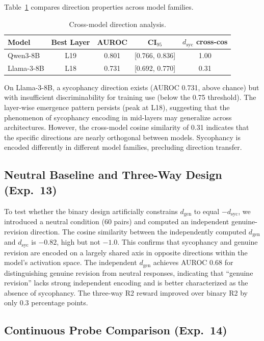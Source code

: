 \documentclass[11pt,a4paper]{article}
\newcommand{\dsyc}{$d_{\text{syc}}$}
\newcommand{\dgen}{$d_{\text{gen}}$}
\begin{document}
Table~\ref{tab:cross_model} compares direction properties across model families.

\begin{table}[h]
\centering
\small
\caption{Cross-model direction analysis.}
\label{tab:cross_model}
\begin{tabular}{lcccc}
\toprule
Model & Best Layer & AUROC & CI$_{95}$ & $d_{\text{syc}}$ cross-cos \\
\midrule
Qwen3-8B   & L19 & 0.801 & [0.766, 0.836] & 1.00 \\
Llama-3-8B & L18 & 0.731 & [0.692, 0.770] & 0.31 \\
\bottomrule
\end{tabular}
\end{table}

On Llama-3-8B, a sycophancy direction exists (AUROC 0.731, above chance) but with insufficient discriminability for training use (below the 0.75 threshold). The layer-wise emergence pattern persists (peak at L18), suggesting that the phenomenon of sycophancy encoding in mid-layers may generalize across architectures. However, the cross-model cosine similarity of 0.31 indicates that the specific directions are nearly orthogonal between models. Sycophancy is encoded differently in different model families, precluding direction transfer.

\subsection{Neutral Baseline and Three-Way Design (Exp.\ 13)}

To test whether the binary design artificially constrains \dgen{} to equal $-$\dsyc{}, we introduced a neutral condition (60 pairs) and computed an independent genuine-revision direction. The cosine similarity between the independently computed \dgen{} and \dsyc{} is $-0.82$, high but not $-1.0$. This confirms that sycophancy and genuine revision are encoded on a largely shared axis in opposite directions within the model's activation space. The independent \dgen{} achieves AUROC 0.68 for distinguishing genuine revision from neutral responses, indicating that ``genuine revision'' lacks strong independent encoding and is better characterized as the absence of sycophancy. The three-way R2 reward improved over binary R2 by only 0.3 percentage points.

\subsection{Continuous Probe Comparison (Exp.\ 14)}
\label{sec:cont_probe}
\end{document}
